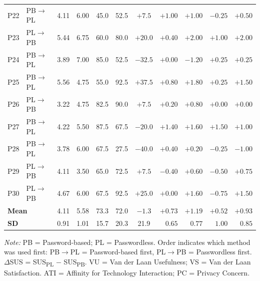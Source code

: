 \documentclass{article}
\begin{document}
\begin{table}[htbp]
\begin{threeparttable}
\begin{tabular}{clccrrcrrrr}
            P22 & PB$\rightarrow$PL & 4.11 & 6.00 & 45.0 & 52.5 & $+7.5$ & $+1.00$ & $+1.00$ & $-0.25$ & $+0.50$ \\
            P23 & PL$\rightarrow$PB & 5.44 & 6.75 & 60.0 & 80.0 & $+20.0$ & $+0.40$ & $+2.00$ & $+1.00$ & $+2.00$ \\
            P24 & PB$\rightarrow$PL & 3.89 & 7.00 & 85.0 & 52.5 & $-32.5$ & $+0.00$ & $-1.20$ & $+0.25$ & $+0.25$ \\
            P25 & PB$\rightarrow$PL & 5.56 & 4.75 & 55.0 & 92.5 & $+37.5$ & $+0.80$ & $+1.80$ & $+0.25$ & $+1.50$ \\
            P26 & PL$\rightarrow$PB & 3.22 & 4.75 & 82.5 & 90.0 & $+7.5$ & $+0.20$ & $+0.80$ & $+0.00$ & $+0.00$ \\
            P27 & PB$\rightarrow$PL & 4.22 & 5.50 & 87.5 & 67.5 & $-20.0$ & $+1.40$ & $+1.60$ & $+1.50$ & $+1.00$ \\
            P28 & PB$\rightarrow$PL & 3.78 & 6.00 & 67.5 & 27.5 & $-40.0$ & $+0.40$ & $+0.20$ & $-0.25$ & $-1.00$ \\
            P29 & PL$\rightarrow$PB & 4.11 & 3.50 & 65.0 & 72.5 & $+7.5$ & $-0.40$ & $+0.60$ & $-0.50$ & $+0.75$ \\
            P30 & PL$\rightarrow$PB & 4.67 & 6.00 & 67.5 & 92.5 & $+25.0$ & $+0.00$ & $+1.60$ & $-0.75$ & $+1.50$ \\
            \midrule
            \multicolumn{2}{l}{\textbf{Mean}} & 4.11 & 5.58 & 73.3 & 72.0 & $-1.3$ & $+0.73$ & $+1.19$ & $+0.52$ & $+0.93$ \\
            \multicolumn{2}{l}{\textbf{SD}} & 0.91 & 1.01 & 15.7 & 20.3 & 21.9 & $0.65$ & $0.77$ & $1.00$ & $0.85$ \\
            \bottomrule
        \end{tabular}
        \begin{tablenotes}
            \small
            \item \textit{Note:} PB = Password-based; PL = Passwordless. Order indicates which method was used first: PB$\rightarrow$PL = Password-based first, PL$\rightarrow$PB = Passwordless first. $\Delta$SUS = SUS\textsubscript{PL} $-$ SUS\textsubscript{PB}. VU = Van der Laan Usefulness; VS = Van der Laan Satisfaction. ATI = Affinity for Technology Interaction; PC = Privacy Concern.
        \end{tablenotes}
    \end{threeparttable}
\end{table}
\end{document}

